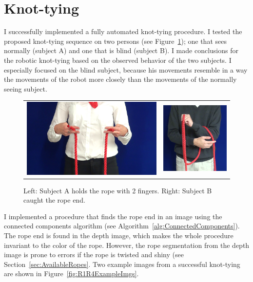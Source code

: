     \section{Knot-tying}
        I successfully implemented a fully automated knot-tying procedure. I tested the proposed knot-tying sequence on two persons (see Figure~\ref{fig:ABExamples}); one that sees normally (subject A) and one that is blind (subject B). I made conclusions for the robotic knot-tying based on the observed behavior of the two subjects. I especially focused on the blind subject, because his movements resemble in a way the movements of the  \CloPeMa\/ robot more closely than the movements of the normally seeing subject.

        \begin{figure}[h]
            \centering
            \begin{tabular}{cc}
            \includegraphics[height=0.3\textwidth]{Img/tyer/ATwoFingers.png}
            &
            \includegraphics[height=0.3\textwidth]{Img/tyer/BLookingForRopeEnd.png}
            \end{tabular}
            \caption{Left: Subject A holds the rope with 2 fingers. Right: Subject B caught the rope end.}
            \label{fig:ABExamples}
        \end{figure}

        I implemented a procedure that finds the rope end in an image using the connected components algorithm (see Algorithm~\ref{alg:ConnectedComponents}). The rope end is found in the depth image, which makes the whole procedure invariant to the color of the rope. However, the rope segmentation from the depth image is prone to errors if the rope is twisted and shiny (see Section~\ref{sec:AvailableRopes}. Two example images from a successful knot-tying are shown in Figure~\ref{fig:R1R4ExampleImgs}.

